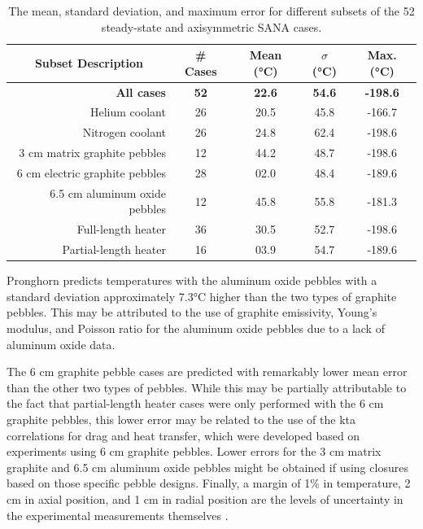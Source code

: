 \begin{table}[h!]
\caption{The mean, standard deviation, and maximum error for different subsets of the 52 steady-state and axisymmetric SANA cases.}
\centering
\begin{tabular}{|r |c |c c c |}
\hline\hline
\multicolumn{1}{|c|}{Subset Description} & \# Cases & Mean (\si{\celsius}) & \(\sigma\) (\si{\celsius}) & Max. (\si{\celsius})\Tstrut\Bstrut\\
\hline
\textbf{All cases} & \textbf{52} & \textbf{22.6} & \textbf{54.6} & \textbf{\color{white}-\color{black}198.6}\Tstrut\\
Helium coolant & 26 & 20.5 & 45.8 & \color{white}-\color{black}166.7\\
Nitrogen coolant & 26 & 24.8 & 62.4 & \color{white}-\color{black}198.6\\
3 \si{\centi\meter} matrix graphite pebbles & 12 & 44.2 & 48.7 & \color{white}-\color{black}198.6\\
6 \si{\centi\meter} electric graphite pebbles & 28 & \color{white}0\color{black}2.0 & 48.4 & -189.6\\
6.5 \si{\centi\meter} aluminum oxide pebbles & 12 & 45.8 & 55.8 & \color{white}-\color{black}181.3\\
Full-length heater & 36 & 30.5 & 52.7 & \color{white}-\color{black}198.6\\
Partial-length heater & 16 & \color{white}0\color{black}3.9 & 54.7 & -189.6\Bstrut\\
\hline
\end{tabular}
\label{table:subcases}
\end{table}

Pronghorn predicts temperatures with the aluminum oxide pebbles with a standard deviation approximately 7.3\si{\celsius} higher than the two types of graphite pebbles. This may be attributed to the use of graphite emissivity, Young's modulus, and Poisson ratio for the aluminum oxide pebbles due to a lack of aluminum oxide data. 

The 6 \si{\centi\meter} graphite pebble cases are predicted with remarkably lower mean error than the other two types of pebbles. While this may be partially attributable to the fact that partial-length heater cases were only performed with the 6 \si{\centi\meter} graphite pebbles, this lower error may be related to the use of the \gls{kta} correlations for drag and heat transfer, which were developed based on experiments using 6 \si{\centi\meter} graphite pebbles. Lower errors for the 3 \si{\centi\meter} matrix graphite and 6.5 \si{\centi\meter} aluminum oxide pebbles might be obtained if using closures based on those specific pebble designs. Finally, a margin of 1\% in temperature, 2 \si{\centi\meter} in axial position, and 1 \si{\centi\meter} in radial position are the levels of uncertainty in the experimental measurements themselves \cite{becker2003}.

